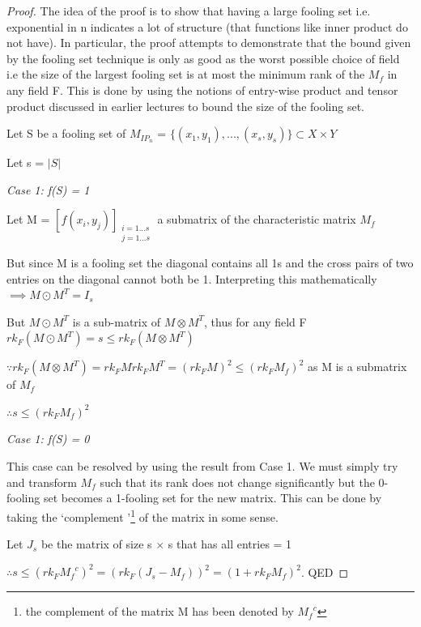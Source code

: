 \documentclass[usletter]{article}
\begin{document}
\begin{proof}
The idea of the proof is to show that having a large fooling set i.e. exponential in n indicates a lot of structure (that functions like inner product do not have). In particular, the proof attempts to demonstrate that the bound given by the fooling set technique is only as good as the worst possible choice of field i.e the size of the largest fooling set is at most the minimum rank of the $M_f$ in any field F. This is done by using the notions of entry-wise product and tensor product discussed in earlier lectures to bound the size of the fooling set. \newline

\noindent Let S be a fooling set of $M_{IP_n}$ = $\{(x_1, y_1), ... , (x_s, y_s)\} \subset X \times Y $ \newline

\noindent Let s = $\lvert S \rvert$ \newline

\noindent \emph{Case 1: f(S) = 1} \newline

\noindent Let M = ${[ f(x_i, y_j) ]}_{\substack {i = 1 ... s \\ j = 1 ... s}}$ a submatrix of the characteristic matrix $M_{f}$ \newline

\noindent But since M is a fooling set the diagonal contains all 1s and the cross pairs of two entries on the diagonal cannot both be 1. Interpreting this mathematically $\implies M \odot M^T = I_s$ \newline

\noindent But $M \odot M^T$  is a sub-matrix of $M \otimes M^T$, thus for any field F $rk_F (M \odot M^T) = s \leq rk_F (M \otimes M^T)$ \newline

\noindent $\because  rk_F (M \otimes M^T) =  rk_F M  \dot rk_F M^T = {(rk_F M)}^2 \leq {(rk_F M_f)}^2 $ as M is a submatrix of $M_f$ \newline

\noindent $\therefore s \leq {(rk_F M_f)}^2 $ \newline

\noindent \emph{Case 1: f(S) = 0} \newline

\noindent This case can be resolved by using the result from Case 1. We must simply try and transform $M_f$ such that its rank does not change significantly but the 0-fooling set becomes a 1-fooling set for the new matrix. This can be done by taking the \lq complement \rq \footnote {the complement of the matrix M has been denoted by ${M_f}^c$} of the matrix in some sense. \newline

\noindent Let $J_s$ be the matrix of size s $\times$ s that has all entries = 1 \newline

\noindent $\therefore s \leq {(rk_F {M_f}^c)}^2 = {(rk_F (J_s - M_f))}^2 = {(1 + rk_F M_f)}^2$. QED

\end{proof}
\end{document}
